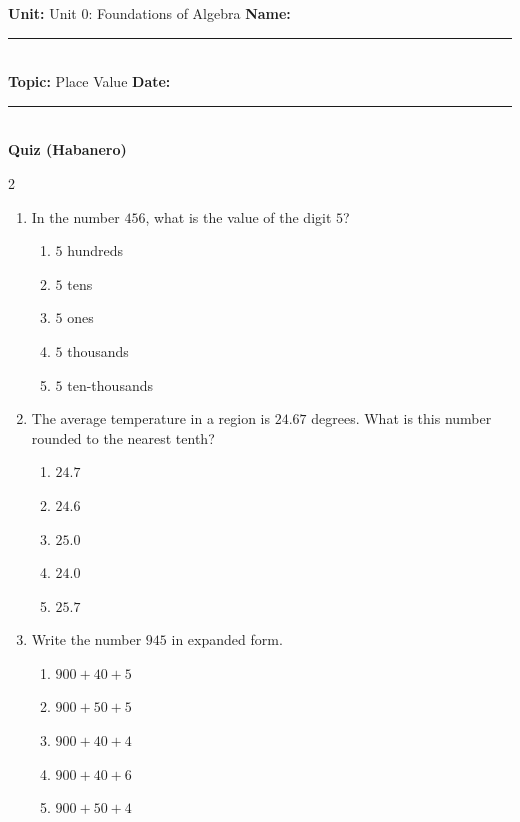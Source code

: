 \documentclass[10pt]{article}
\begin{document}
\enlargethispage{2.5cm}

\begin{tcolorbox}[colback=mainblue!5, colframe=mainblue, sharp corners, boxrule=0.5pt]
    \small \textbf{Unit:} Unit 0: Foundations of Algebra \hfill \textbf{Name:} \rule{3cm}{0.4pt} \\
    \small \textbf{Topic:} Place Value \hfill \textbf{Date:} \rule{2cm}{0.4pt} \\
    \centering \textbf{\large Quiz (Habanero)}
\end{tcolorbox}

\vspace{0.2cm}

\begin{multicols}{2}
\begin{enumerate}[label=\textbf{Q\arabic*.}, leftmargin=*, itemsep=6pt, parsep=0pt]

  \item \small In the number $456$, what is the value of the digit $5$?
  \begin{enumerate}[label=(\Alph*), leftmargin=0.6cm, nosep, itemsep=2pt]
    \item $5$ hundreds
    \item $5$ tens
    \item $5$ ones
    \item $5$ thousands
    \item $5$ ten-thousands
  \end{enumerate}

  \item \small The average temperature in a region is $24.67$ degrees. What is this number rounded to the nearest tenth?
  \begin{enumerate}[label=(\Alph*), leftmargin=0.6cm, nosep, itemsep=2pt]
    \item $24.7$
    \item $24.6$
    \item $25.0$
    \item $24.0$
    \item $25.7$
  \end{enumerate}

  \item \small Write the number $945$ in expanded form.
  \begin{enumerate}[label=(\Alph*), leftmargin=0.6cm, nosep, itemsep=2pt]
    \item $900 + 40 + 5$
    \item $900 + 50 + 5$
    \item $900 + 40 + 4$
    \item $900 + 40 + 6$
    \item $900 + 50 + 4$
  \end{enumerate}


\end{enumerate}
\end{multicols}
\end{document}
